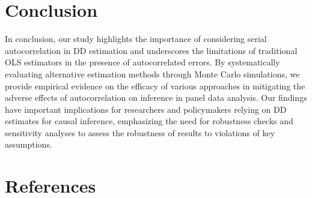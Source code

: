 \documentclass[11pt, a4paper, leqno]{article}
\begin{document}
\section{Conclusion} %
\label{sec:conclusion}

In conclusion, our study highlights the importance of considering serial autocorrelation in DD estimation and underscores the limitations of traditional OLS estimators in the presence of autocorrelated errors. 
By systematically evaluating alternative estimation methods through Monte Carlo simulations, we provide empirical evidence on the efficacy of various approaches in mitigating the adverse effects of autocorrelation 
on inference in panel data analysis. Our findings have important implications for researchers and policymakers relying on DD estimates for causal inference, emphasizing the need for robustness checks and sensitivity analyses 
to assess the robustness of results to violations of key assumptions.

\clearpage

\section{References}
\label{sec:references} 
\end{document}
